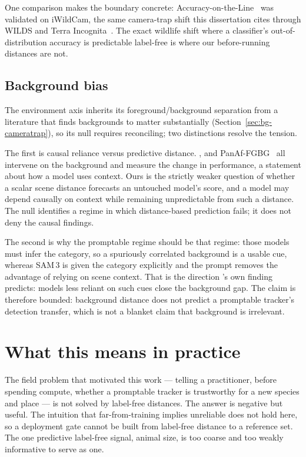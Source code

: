 One comparison makes the boundary concrete: Accuracy-on-the-Line~\cite{aotl} was validated on iWildCam, the
same camera-trap shift this dissertation cites through WILDS and Terra Incognita~\cite{wilds,terra}. The exact
wildlife shift where a classifier's out-of-distribution accuracy is predictable label-free is where our
before-running distances are not.

\subsection{Background bias}
The environment axis inherits its foreground/background separation from a literature that finds backgrounds
to matter substantially (Section~\ref{sec:bg-cameratrap}), so its null requires reconciling; two
distinctions resolve the tension.

The first is causal reliance versus predictive distance. \citet{xiao}, \citet{elephant} and
PanAf-FGBG~\cite{panaf} all intervene on the background and measure the change in performance, a statement
about how a model uses context. Ours is the strictly weaker question of whether a scalar scene
distance forecasts an untouched model's score, and a model may depend causally on context while remaining
unpredictable from such a distance. The null identifies a regime in which distance-based prediction fails; it
does not deny the causal findings.

The second is why the promptable regime should be that regime: those models must infer the category, so a
spuriously correlated background is a usable cue, whereas SAM\,3 is given the category explicitly and the
prompt removes the advantage of relying on scene context. That is the direction \citet{xiao}'s own finding predicts:
models less reliant on such cues close the background gap. The claim is therefore bounded:
background distance does not predict a promptable tracker's detection transfer, which is not a blanket claim
that background is irrelevant.

\section{What this means in practice}
\label{sec:disc-practice}
The field problem that motivated this work --- telling a practitioner, before spending compute, whether a
promptable tracker is trustworthy for a new species and place --- is not solved by label-free distances. The
answer is negative but useful. The intuition that far-from-training implies unreliable does not hold here, so
a deployment gate cannot be built from label-free distance to a reference set. The one predictive label-free
signal, animal size, is too coarse and too weakly informative to serve as one.

